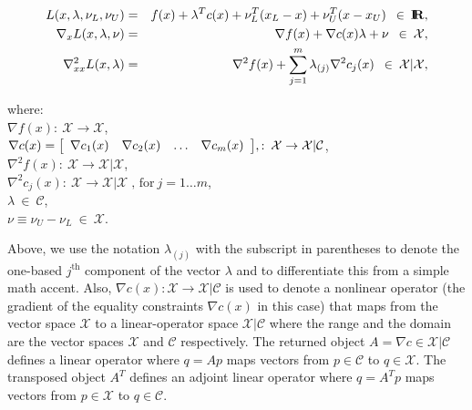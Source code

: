 \documentclass[pdf,12pt,report]{SANDreport}
\begin{document}
{\bsinglespace
\begin{eqnarray}
L(x,\lambda,\nu_L,\nu_U)
& = & f(x) + \lambda^T c(x) + \nu_L^T ( x_L - x ) + \nu_U^T ( x - x_U ) \; \:\in\:\RE,
\label{moocho:eqn:L_def} \\
\nabla_{x} L(x,\lambda,\nu)
& = & \nabla f(x) + \nabla c(x) \lambda + \nu \; \:\in\:\mathcal{X},
\label{moocho:eqn:GL_def} \\
\nabla_{xx}^2 L(x,\lambda)
& = & \nabla^2 f(x) + \sum^m_{j=1} \lambda_{(j)} \nabla^2 c_j(x) \; \:\in\: \mathcal{X}|\mathcal{X},
\label{moocho:eqn:HL_def}
\end{eqnarray}}
%
\begin{tabbing}
\hspace{4ex}where:\hspace{5ex}\= \\
\>	$\nabla f(x) : \:\mathcal{X} \rightarrow \mathcal{X}$, \\
\>	$\nabla c(x) = {\bmat{cccc} \nabla c_1 (x) & \nabla c_2 (x) & \ldots & \nabla c_m (x)  \emat},
         : \:\mathcal{X} \rightarrow \mathcal{X}|\mathcal{C}$, \\
\>	$\nabla^2 f(x) : \:\mathcal{X} \rightarrow \mathcal{X}|\mathcal{X}$, \\
\>	$\nabla^2 c_j(x) : \:\mathcal{X} \rightarrow \mathcal{X}|\mathcal{X} \; \mbox{, for}\:j = 1 \ldots m$, \\
\>	$\lambda \:\in\:\mathcal{C}$, \\
\>	$\nu \equiv \nu_U - \nu_L \:\in\:\mathcal{X}$.
\end{tabbing}

Above, we use the notation $\lambda_{(j)}$ with the subscript in parentheses
to denote the one-based $j^{\mbox{th}}$ component of the vector $\lambda$ and
to differentiate this from a simple math accent.  Also, $\nabla c(x) :
{}\mathcal{X} {}\rightarrow {}\mathcal{X}|\mathcal{C}$ is used to denote a
nonlinear operator (the gradient of the equality constraints $\nabla c(x)$ in
this case) that maps from the vector space $\mathcal{X}$ to a linear-operator
space $\mathcal{X}|\mathcal{C}$ where the range and the domain are the vector
spaces $\mathcal{X}$ and $\mathcal{C}$ respectively.  The returned object $A =
{}\nabla c {}\in\mathcal{X}|\mathcal{C}$ defines a linear operator where $q =
A p$ maps vectors from $p \in\mathcal{C}$ to $q {}\in\mathcal{X}$.  The
transposed object $A^T$ defines an adjoint linear operator where $q = A^T p$
maps vectors from $p {}\in\mathcal{X}$ to $q {}\in\mathcal{C}$.
\end{document}

